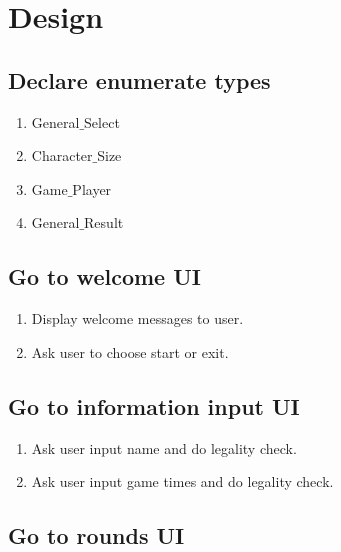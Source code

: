 \documentclass[12pt]{article}
\begin{document}
	
	
	\section{Design}
	
	\subsection{Declare enumerate types}
		
		\begin{enumerate}
			\item General$\_$Select
			\item Character$\_$Size
			\item Game$\_$Player
			\item General$\_$Result
		\end{enumerate}
	
	\subsection{Go to welcome UI}
		
		\begin{enumerate}
			\item Display welcome messages to user.
			\item Ask user to choose start or exit.
		\end{enumerate}
		
	\subsection{Go to information input UI}
		
		\begin{enumerate}
			\item Ask user input name and do legality check.
			\item Ask user input game times and do legality check.
		\end{enumerate}
		
	\subsection{Go to rounds UI}
		
\end{document}
